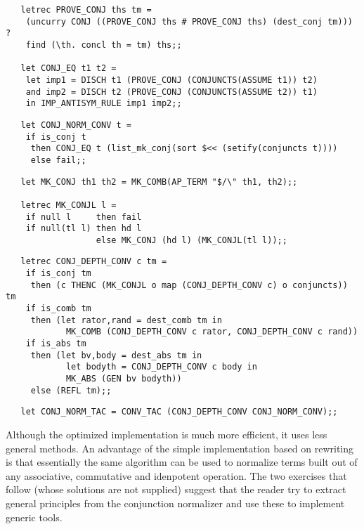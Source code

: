 \begin{hol}\begin{verbatim}
   letrec PROVE_CONJ ths tm =
    (uncurry CONJ ((PROVE_CONJ ths # PROVE_CONJ ths) (dest_conj tm))) ?
    find (\th. concl th = tm) ths;;

   let CONJ_EQ t1 t2 =
    let imp1 = DISCH t1 (PROVE_CONJ (CONJUNCTS(ASSUME t1)) t2)
    and imp2 = DISCH t2 (PROVE_CONJ (CONJUNCTS(ASSUME t2)) t1) 
    in IMP_ANTISYM_RULE imp1 imp2;;
\end{verbatim}\end{hol}

\begin{hol}\begin{verbatim}
   let CONJ_NORM_CONV t =
    if is_conj t
     then CONJ_EQ t (list_mk_conj(sort $<< (setify(conjuncts t))))
     else fail;;
\end{verbatim}\end{hol}

\begin{hol}\begin{verbatim}
   let MK_CONJ th1 th2 = MK_COMB(AP_TERM "$/\" th1, th2);;

   letrec MK_CONJL l =
    if null l     then fail
    if null(tl l) then hd l
                  else MK_CONJ (hd l) (MK_CONJL(tl l));;
\end{verbatim}\end{hol}

\begin{hol}\begin{verbatim}
   letrec CONJ_DEPTH_CONV c tm =
    if is_conj tm 
     then (c THENC (MK_CONJL o map (CONJ_DEPTH_CONV c) o conjuncts)) tm
    if is_comb tm
     then (let rator,rand = dest_comb tm in
            MK_COMB (CONJ_DEPTH_CONV c rator, CONJ_DEPTH_CONV c rand))
    if is_abs tm 
     then (let bv,body = dest_abs tm in
            let bodyth = CONJ_DEPTH_CONV c body in
            MK_ABS (GEN bv bodyth))
     else (REFL tm);;
\end{verbatim}\end{hol}

\begin{hol}\begin{verbatim}
   let CONJ_NORM_TAC = CONV_TAC (CONJ_DEPTH_CONV CONJ_NORM_CONV);;
\end{verbatim}\end{hol}


Although the optimized implementation is much more efficient, it uses
less general methods. An advantage of the simple implementation based
on rewriting is that essentially the same algorithm can be used to
normalize terms built out of any associative, commutative and
idenpotent operation. The two exercises that follow (whose solutions are not
supplied) suggest that the reader try to extract general principles from the
conjunction normalizer and use these to implement generic tools.

